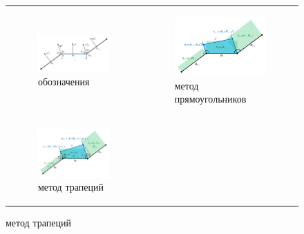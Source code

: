 \documentclass[a4paper,14pt]{extarticle}                     %
\theoremstyle{plain}                                         %
\begin{document}
\begin{figure}[ht]
\centering
\begin{tabular}{ll}
\begin{subfigure}{0.45\textwidth}\centering\includegraphics[width=0.75\columnwidth]{pics/text_1_remesh_2d/grid_normals.pdf}\caption{обозначения}\end{subfigure} &
\begin{subfigure}{0.45\textwidth}\centering\includegraphics[width=0.75\columnwidth]{pics/text_1_remesh_2d/remesh_rectangles.pdf}\caption{метод прямоугольников}\end{subfigure} \\
\begin{subfigure}{0.45\textwidth}\centering\includegraphics[width=0.75\columnwidth]{pics/text_1_remesh_2d/remesh_trapeziums.pdf}\caption{метод трапеций}\end{subfigure} &

\end{tabular}
\end{figure}
\end{document}
